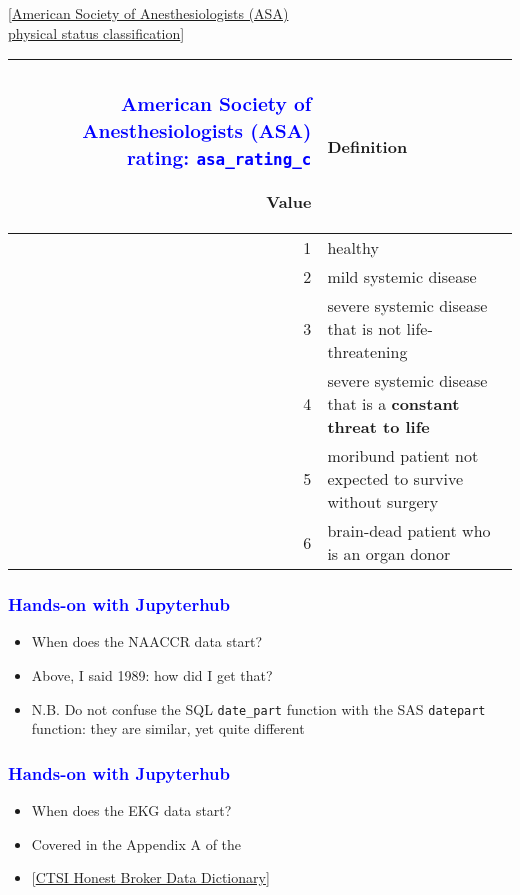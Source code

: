 \documentclass[11pt,pdftex,dvipsnames,usenames]{beamer}
\begin{document}
\begin{frame}[fragile]
\textcolor{PineGreen}{[\href{https://www.ncbi.nlm.nih.gov/books/NBK441940}
  {American Society of Anesthesiologists (ASA)\\ 
physical status classification}]}
\begin{tabular}{r|l}\frametitle{\bf\textcolor{blue}{
American Society of Anesthesiologists (ASA) rating: \texttt{asa\_rating\_c}}}
Value & Definition \\ \hline
1 & healthy \\
2 & mild systemic disease \\
3 & severe systemic disease that is not life-threatening \\
4 & severe systemic disease that is a {\bf constant threat to life} \\
5 & moribund patient not expected to survive without surgery \\
6 & brain-dead patient who is an organ donor 
\end{tabular}
\end{frame}

\begin{frame}[fragile]\frametitle{\bf\textcolor{blue}{Hands-on with Jupyterhub}}
\begin{itemize}
\item When does the NAACCR data start?
\item Above, I said 1989: how did I get that?
\item N.B. Do not confuse the SQL \texttt{date\_part} function with 
the SAS \texttt{datepart} function: they are similar, yet quite different
\end{itemize}

\end{frame}

\begin{frame}[fragile]\frametitle{\bf\textcolor{blue}{Hands-on with Jupyterhub}}
\begin{itemize}
\item When does the EKG data start?
\item Covered in the Appendix A of the 
\item \textcolor{PineGreen}{[\href{https://ctri.mcw.edu/wp-content/uploads/CTSI-Honest-Broker-Data-Dictionary.pdf}{CTSI Honest Broker Data Dictionary}]}
\end{itemize}

\end{frame}
\end{document}
